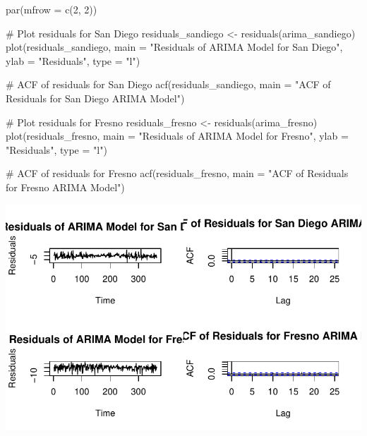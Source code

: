 \documentclass[
  11pt,
]{article}
\newenvironment{Shaded}{\begin{snugshade}}{\end{snugshade}}
\newcommand{\AttributeTok}[1]{\textcolor[rgb]{0.40,0.45,0.13}{#1}}
\newcommand{\CommentTok}[1]{\textcolor[rgb]{0.37,0.37,0.37}{#1}}
\newcommand{\DecValTok}[1]{\textcolor[rgb]{0.68,0.00,0.00}{#1}}
\newcommand{\FunctionTok}[1]{\textcolor[rgb]{0.28,0.35,0.67}{#1}}
\newcommand{\NormalTok}[1]{\textcolor[rgb]{0.00,0.23,0.31}{#1}}
\newcommand{\OtherTok}[1]{\textcolor[rgb]{0.00,0.23,0.31}{#1}}
\newcommand{\StringTok}[1]{\textcolor[rgb]{0.13,0.47,0.30}{#1}}
\begin{document}
\begin{Shaded}
\begin{Highlighting}[]
\FunctionTok{par}\NormalTok{(}\AttributeTok{mfrow =} \FunctionTok{c}\NormalTok{(}\DecValTok{2}\NormalTok{, }\DecValTok{2}\NormalTok{)) }

\CommentTok{\# Plot residuals for San Diego}
\NormalTok{residuals\_sandiego }\OtherTok{\textless{}{-}} \FunctionTok{residuals}\NormalTok{(arima\_sandiego)}
\FunctionTok{plot}\NormalTok{(residuals\_sandiego, }\AttributeTok{main =} \StringTok{"Residuals of ARIMA Model for San Diego"}\NormalTok{, }\AttributeTok{ylab =} \StringTok{"Residuals"}\NormalTok{, }\AttributeTok{type =} \StringTok{"l"}\NormalTok{)}

\CommentTok{\# ACF of residuals for San Diego}
\FunctionTok{acf}\NormalTok{(residuals\_sandiego, }\AttributeTok{main =} \StringTok{"ACF of Residuals for San Diego ARIMA Model"}\NormalTok{)}

\CommentTok{\# Plot residuals for Fresno}
\NormalTok{residuals\_fresno }\OtherTok{\textless{}{-}} \FunctionTok{residuals}\NormalTok{(arima\_fresno)}
\FunctionTok{plot}\NormalTok{(residuals\_fresno, }\AttributeTok{main =} \StringTok{"Residuals of ARIMA Model for Fresno"}\NormalTok{, }\AttributeTok{ylab =} \StringTok{"Residuals"}\NormalTok{, }\AttributeTok{type =} \StringTok{"l"}\NormalTok{)}

\CommentTok{\# ACF of residuals for Fresno}
\FunctionTok{acf}\NormalTok{(residuals\_fresno, }\AttributeTok{main =} \StringTok{"ACF of Residuals for Fresno ARIMA Model"}\NormalTok{)}
\end{Highlighting}
\end{Shaded}

\includegraphics{project_files/figure-pdf/unnamed-chunk-89-1.pdf}
\end{document}
